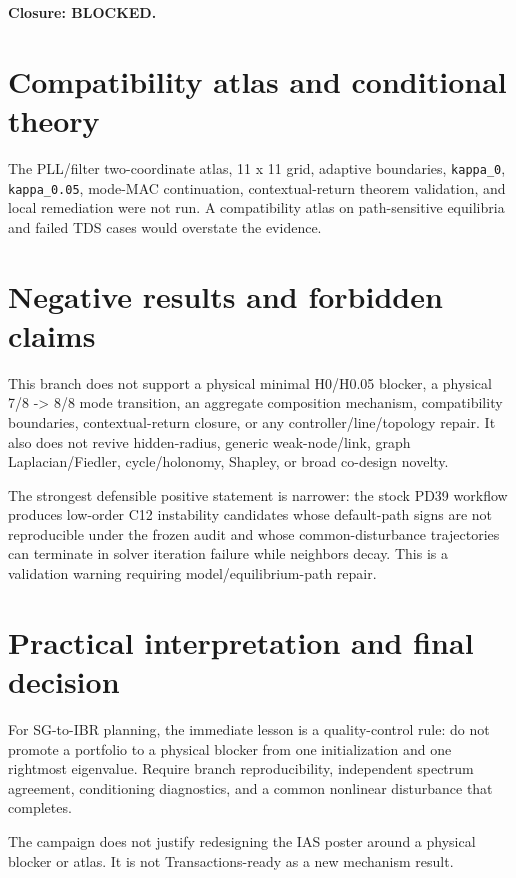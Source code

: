 \documentclass[10pt]{article}
\newcommand{\code}[1]{\texttt{#1}}
\begin{document}
\textbf{Closure: BLOCKED.}

\section{Compatibility atlas and conditional theory}

The PLL/filter two-coordinate atlas, 11 x 11 grid, adaptive boundaries,
\code{kappa\_0}, \code{kappa\_0.05}, mode-MAC continuation, contextual-return
theorem validation, and local remediation were not run. A compatibility atlas
on path-sensitive equilibria and failed TDS cases would overstate the evidence.

\section{Negative results and forbidden claims}

This branch does not support a physical minimal H0/H0.05 blocker, a physical
7/8 -> 8/8 mode transition, an aggregate composition mechanism, compatibility
boundaries, contextual-return closure, or any controller/line/topology repair.
It also does not revive hidden-radius, generic weak-node/link, graph
Laplacian/Fiedler, cycle/holonomy, Shapley, or broad co-design novelty.

The strongest defensible positive statement is narrower: the stock PD39
workflow produces low-order C12 instability candidates whose default-path
signs are not reproducible under the frozen audit and whose common-disturbance
trajectories can terminate in solver iteration failure while neighbors decay.
This is a validation warning requiring model/equilibrium-path repair.

\section{Practical interpretation and final decision}

For SG-to-IBR planning, the immediate lesson is a quality-control rule: do not
promote a portfolio to a physical blocker from one initialization and one
rightmost eigenvalue. Require branch reproducibility, independent spectrum
agreement, conditioning diagnostics, and a common nonlinear disturbance that
completes.

The campaign does not justify redesigning the IAS poster around a physical
blocker or atlas. It is not Transactions-ready as a new mechanism result.
\end{document}
